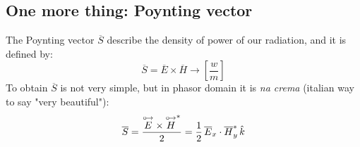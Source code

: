 \subsection*{One more thing: Poynting vector}
The Poynting vector $\overline{S}$ describe the density of power of our radiation, and it is defined by:
\begin{equation}
    \overline{S}=\overline{E}\times\overline{H}\rightarrow\left[\frac{w}{m}\right]
\end{equation}
To obtain $\overline{S}$ is not very simple, but in phasor domain it is \emph{na crema} (italian way to say "very beautiful"):
\begin{equation}
    \overline{S}=\frac{\overset{\mathbin {{\circ \mkern-2.5mu\rightarrow}}}{E}\times\overset{\mathbin {{\circ \mkern-2.5mu\rightarrow}}}{H}^*}{2}=\frac{1}{2}\,\overline{E}
_x\cdot\overline{H}_y^*\,\hat{\mathnormal{k}}
\end{equation}